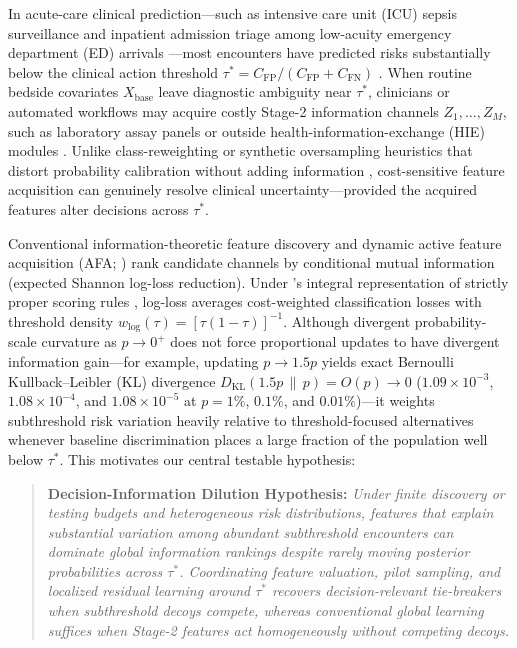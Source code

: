 \documentclass[11pt]{article}
\begin{document}
In acute-care clinical prediction---such as intensive care unit (ICU) sepsis surveillance \citep{singer2016sepsis3,reyna2020early} and inpatient admission triage among low-acuity emergency department (ED) arrivals \citep{hong2018predicting}---most encounters have predicted risks substantially below the clinical action threshold $\tau^* = C_{\text{FP}} / (C_{\text{FP}} + C_{\text{FN}})$ \citep{vickers2006decision,kerr2016assessing}. When routine bedside covariates $X_{\text{base}}$ leave diagnostic ambiguity near $\tau^*$, clinicians or automated workflows may acquire costly Stage-2 information channels $Z_1, \dots, Z_M$, such as laboratory assay panels or outside health-information-exchange (HIE) modules \citep{turney1995cost,saartsechansky2009active,bilgic2011value,covert2023learning,vonkleist2025evaluation}. Unlike class-reweighting or synthetic oversampling heuristics that distort probability calibration without adding information \citep{chawla2002smote,elkan2001foundations,vancalster2019calibration,vandengoorbergh2022harm}, cost-sensitive feature acquisition can genuinely resolve clinical uncertainty---provided the acquired features alter decisions across $\tau^*$.

Conventional information-theoretic feature discovery and dynamic active feature acquisition (AFA; \citealp{covert2023learning}) rank candidate channels by conditional mutual information (expected Shannon log-loss reduction). Under \citet{schervish1989general}'s integral representation of strictly proper scoring rules \citep{buja2005loss,gneiting2007strictly}, log-loss averages cost-weighted classification losses with threshold density $w_{\log}(\tau) = [\tau(1-\tau)]^{-1}$. Although divergent probability-scale curvature as $p \to 0^+$ does not force proportional updates to have divergent information gain---for example, updating $p \to 1.5p$ yields exact Bernoulli Kullback--Leibler (KL) divergence $D_{\text{KL}}(1.5p \,\|\, p) = O(p) \to 0$ ($1.09 \times 10^{-3}$, $1.08 \times 10^{-4}$, and $1.08 \times 10^{-5}$ at $p = 1\%$, $0.1\%$, and $0.01\%$)---it weights subthreshold risk variation heavily relative to threshold-focused alternatives whenever baseline discrimination places a large fraction of the population well below $\tau^*$. This motivates our central testable hypothesis:
\begin{quote}
\textbf{Decision-Information Dilution Hypothesis:} \emph{Under finite discovery or testing budgets and heterogeneous risk distributions, features that explain substantial variation among abundant subthreshold encounters can dominate global information rankings despite rarely moving posterior probabilities across $\tau^*$. Coordinating feature valuation, pilot sampling, and localized residual learning around $\tau^*$ recovers decision-relevant tie-breakers when subthreshold decoys compete, whereas conventional global learning suffices when Stage-2 features act homogeneously without competing decoys.}
\end{quote}
\end{document}
